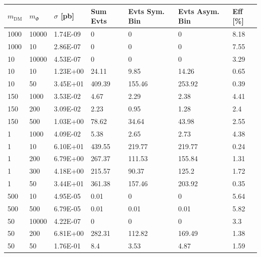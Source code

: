 \begin{table}[h!]
\small
\centering
\begin{tabular}{lllllll}
\hline
$m_\textrm{DM}$ & $m_\Phi$ & $\sigma$ [pb] & Sum Evts       & Evts Sym. Bin & Evts Asym. Bin & Eff  [\%]   \\\hline
1000  &  10000 & 1.74E-09 & 0      & 0      & 0      & 8.18 \\
1000  &  10    & 2.86E-07 & 0      & 0      & 0      & 7.55 \\
10  &  10000   & 4.53E-07 & 0      & 0      & 0      & 3.29 \\
10  &  10      & 1.23E+00 & 24.11  & 9.85   & 14.26  & 0.65 \\
10  &  50      & 3.45E+01 & 409.39 & 155.46 & 253.92 & 0.39 \\
150  &  1000   & 3.53E-02 & 4.67   & 2.29   & 2.38   & 4.41 \\
150  &  200    & 3.09E-02 & 2.23   & 0.95   & 1.28   & 2.4  \\
150  &  500    & 1.03E+00 & 78.62  & 34.64  & 43.98  & 2.55 \\
1  &  1000     & 4.09E-02 & 5.38   & 2.65   & 2.73   & 4.38 \\
1  &  10       & 6.10E+01 & 439.55 & 219.77 & 219.77 & 0.24 \\
1  &  200      & 6.79E+00 & 267.37 & 111.53 & 155.84 & 1.31 \\
1  &  300      & 4.18E+00 & 215.57 & 90.37  & 125.2  & 1.72 \\
1  &  50       & 3.44E+01 & 361.38 & 157.46 & 203.92 & 0.35 \\
500  &  10     & 4.95E-05 & 0.01   & 0      & 0      & 5.64 \\
500  &  500    & 6.79E-05 & 0.01   & 0.01   & 0.01   & 5.82 \\
50  &  10000   & 4.22E-07 & 0      & 0      & 0      & 3.3  \\
50  &  200     & 6.81E+00 & 282.31 & 112.82 & 169.49 & 1.38 \\
50  &  50      & 1.76E-01 & 8.4    & 3.53   & 4.87   & 1.59 \\

\end{tabular}
\end{table}

